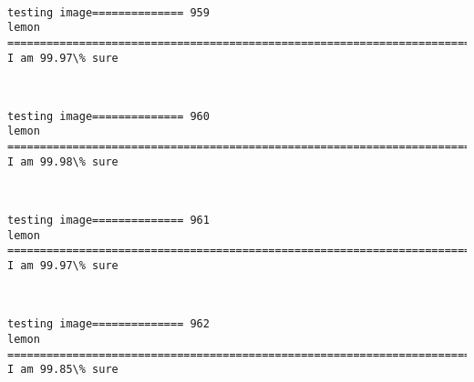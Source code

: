 \documentclass[11pt]{article}
\begin{document}
    \begin{center}
    \end{center}
    { \hspace*{\fill} \\}
    
    \begin{Verbatim}[commandchars=\\\{\}]
testing image============== 959
lemon
============================================================================
I am 99.97\% sure

    \end{Verbatim}

    \begin{center}
    \end{center}
    { \hspace*{\fill} \\}
    
    \begin{Verbatim}[commandchars=\\\{\}]
testing image============== 960
lemon
============================================================================
I am 99.98\% sure

    \end{Verbatim}

    \begin{center}
    \end{center}
    { \hspace*{\fill} \\}
    
    \begin{Verbatim}[commandchars=\\\{\}]
testing image============== 961
lemon
============================================================================
I am 99.97\% sure

    \end{Verbatim}

    \begin{center}
    \end{center}
    { \hspace*{\fill} \\}
    
    \begin{Verbatim}[commandchars=\\\{\}]
testing image============== 962
lemon
============================================================================
I am 99.85\% sure

    \end{Verbatim}
\end{document}
